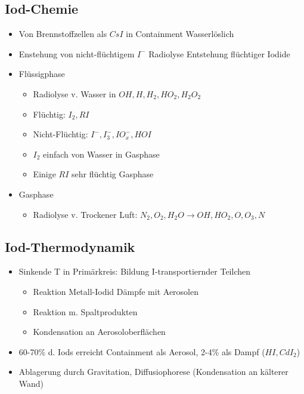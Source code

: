 \documentclass[12pt]{article}
\begin{document}
\subsection{Iod-Chemie}
\begin{itemize}
	\item Von Brennstoffzellen als \(CsI\) in Containment \textrightarrow Wasserlöslich
	\item Enstehung von nicht-flüchtigem \(I^-\) \textrightarrow Radiolyse \textrightarrow Entstehung flüchtiger Iodide
	\item Flüssigphase
		\begin{itemize}
			\item Radiolyse v. Wasser in \(OH, H, H_2, HO_2, H_2O_2\)
			\item Flüchtig: \(I_2, RI\)
			\item Nicht-Flüchtig: \(I^-, I^-_3, IO^-_x, HOI\)
			\item \(I_2\) einfach von Wasser in Gasphase
			\item Einige \(RI\) sehr flüchtig \textrightarrow Gasphase
		\end{itemize}
	\item Gasphase
		\begin{itemize}
			\item Radiolyse v. Trockener Luft: \(N_2, O_2, H_2O \rightarrow OH, HO_2, O, O_3, N\)
		\end{itemize}
\end{itemize}

\subsection{Iod-Thermodynamik}
\begin{itemize}
	\item Sinkende T in Primärkreis: Bildung I-transportiernder Teilchen
		\begin{itemize}
			\item Reaktion Metall-Iodid Dämpfe mit Aerosolen
			\item Reaktion m. Spaltprodukten
			\item Kondensation an Aerosoloberflächen
		\end{itemize}
	\item 60-70\% d. Iods erreicht Containment als Aerosol, 2-4\% als Dampf (\(HI, CdI_2\))
	\item Ablagerung durch Gravitation, Diffusiophorese (Kondensation an kälterer Wand)
\end{itemize}
\end{document}
